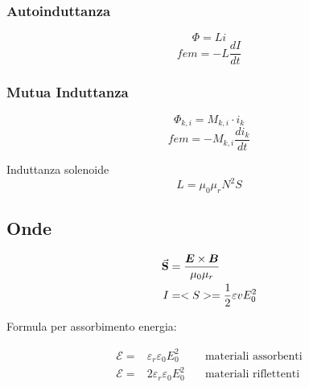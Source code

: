 \documentclass[a4paper]{scrarticle}
\begin{document}
\subsubsection*{Autoinduttanza}
\begin{equation}
    \varPhi = L i
\end{equation}
\begin{equation}
    fem = -L \frac{dI}{dt}
\end{equation}
\subsubsection*{Mutua Induttanza} 
\begin{equation}
    \varPhi_{k, i} = M_{k , i} \cdot i_k 
\end{equation}
\begin{equation}
    fem = -M_{k, i} \frac{di_k}{dt}
\end{equation}

Induttanza solenoide
\begin{equation*}
    L = \mu_0 \mu_r {N^2} S
\end{equation*}


\subsection{Onde}

\begin{align}
    \va S & = \frac{\bm E \times \bm B}{\mu_0 \mu_r}\\
    I & = <S> = \frac{1}{2}\varepsilon v E^2_0
\end{align}

Formula per assorbimento energia:

\begin{align}
    \mathcal E =&  \varepsilon_r \varepsilon_0 E_0^2\quad &\text {materiali assorbenti}\\
    \mathcal E =& 2\varepsilon_r \varepsilon_0 E_0^2\quad &\text {materiali riflettenti}
\end{align}

\pagebreak
\end{document}

